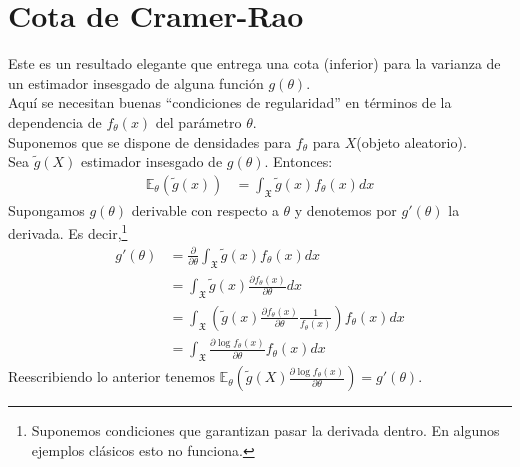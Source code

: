 \documentclass[10pt]{article}
\theoremstyle{plain}
\theoremstyle{definition}
\begin{document}
\section{Cota de Cramer-Rao}
Este es un resultado elegante que entrega una cota (inferior) para la varianza de un estimador insesgado de alguna función $g(\theta)$.\\
Aquí se necesitan buenas ``condiciones de regularidad'' en términos de la dependencia de $f_{\theta}(x)$ del parámetro $\theta$.\\
Suponemos que se dispone de densidades para $f_{\theta}$ para $X$(objeto aleatorio).\\
Sea $\tilde{g}(X)$ estimador insesgado de $g(\theta)$. Entonces:
\begin{align*}
\mathbb{E}_{\theta}(\tilde{g}(x)) &= \int_{\mathfrak{X}}\tilde{g}(x)f_{\theta}(x) dx
\end{align*}
Supongamos $g(\theta)$ derivable con respecto a $\theta$ y denotemos por $g'(\theta)$ la derivada. Es decir,\footnote{Suponemos condiciones que garantizan pasar la derivada dentro. En algunos ejemplos clásicos esto no funciona.}
\begin{align*}
g'(\theta) &= \frac{\partial}{\partial \theta} \int_{\mathfrak{X}} \tilde{g}(x)f_{\theta}(x)dx\\
&= \int_{\mathfrak{X}}\tilde{g}(x) \frac{\partial f_{\theta}(x)}{\partial \theta} dx\\
&= \int_{\mathfrak{X}}\left(\tilde{g}(x) \frac{\partial f_{\theta}(x)}{\partial \theta}\frac{1}{f_{\theta}(x)}\right)f_{\theta}(x) dx\\
&= \int_{\mathfrak{X}}\frac{\partial \log f_{\theta}(x)}{\partial \theta} f_{\theta}(x) dx
\end{align*}
Reescribiendo lo anterior tenemos $\mathbb{E}_{\theta}\left(\tilde{g}(X)\frac{\partial \log f_{\theta}(x)}{\partial \theta}\right) = g'(\theta)$.\\
\end{document}
